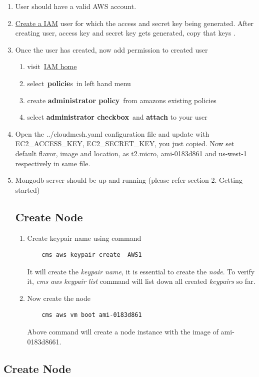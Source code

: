 \documentclass[9pt,twocolumn,twoside]{../../styles/osajnl}
\begin{document}
\begin{enumerate}
\begin{enumerate}
	\item User should have a valid AWS account.
	\item \href{https://console.aws.amazon.com/iam/home?#/users}{Create a IAM}  user for which the access and secret key being generated. After creating user, access key and secret key gets generated, copy that keys \cite{www-attach-policy}.
	\item Once the user has created, now add permission to created user
		\begin{enumerate}
			
			\item visit \href{https://console.aws.amazon.com/iam/home} {IAM home}
			\item select \textbf{policie}s in left hand menu
			\item create \textbf{administrator policy} from amazons existing policies
			\item select \textbf{administrator checkbox} and \textbf{attach} to your user
		\end{enumerate}
	\item Open the ../cloudmesh.yaml configuration file and update with EC2\_ACCESS\_KEY, EC2\_SECRET\_KEY, you just copied. Now set default flavor, image and location, as t2.micro, ami-0183d861 and us-west-1 respectively in same file.
	\item Mongodb server should be up and running (please refer section 2. Getting started)

\subsection{Create Node}

\begin{enumerate}
	\item Create keypair name using command
	
	\begin{verbatim}
	cms aws keypair create  AWS1
	\end{verbatim}
	
	It will create the \textit{keypair name}, it is essential to create the \textit{node}. To verify it, \textit{cms aws keypair list} command will list down all created \textit{keypairs} so far.
	
	\item Now create the node 
	
	\begin{verbatim}
	cms aws vm boot ami-0183d861
	\end{verbatim}
	
	Above command will create a node instance with the image of ami-0183d8661.

\end{enumerate}	
	
\end{enumerate}


\subsection{Create Node}

\end{enumerate}
\end{document}
